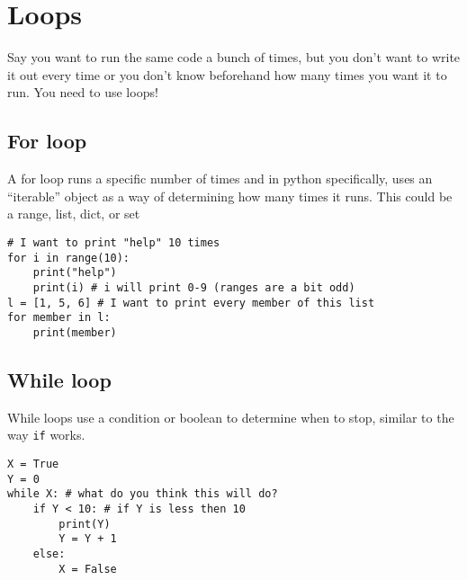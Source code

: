 \documentclass{assignments}
\begin{document}
\section*{Loops}
\label{sec:org93d4890}
Say you want to run the same code a bunch of times, but you don't want to write
it out every time or you don't know beforehand how many times you want it to
run. You need to use loops!
\subsection*{For loop}
\label{sec:org5a58576}
A for loop runs a specific number of times and in python specifically, uses an
``iterable'' object as a way of determining how many times it runs. This could be
a range, list, dict, or set
\begin{verbatim}
# I want to print "help" 10 times
for i in range(10):
    print("help")
    print(i) # i will print 0-9 (ranges are a bit odd)
l = [1, 5, 6] # I want to print every member of this list
for member in l:
    print(member)
\end{verbatim}
\subsection*{While loop}
\label{sec:org8422d73}
While loops use a condition or boolean to determine when to stop, similar to the
way \texttt{if} works.
\begin{verbatim}
X = True
Y = 0
while X: # what do you think this will do?
    if Y < 10: # if Y is less then 10
        print(Y)
        Y = Y + 1
    else:
        X = False

\end{verbatim}
\end{document}
